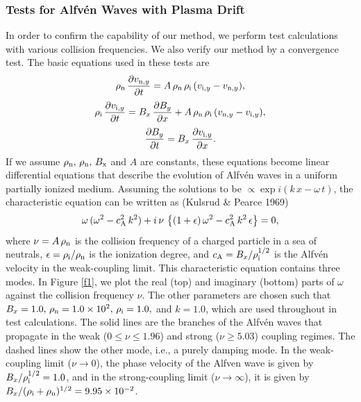 \documentclass[12pt,preprint]{aastex}
\begin{document}
\subsubsection{Tests for Alfv\'en Waves with Plasma Drift}
In order to confirm the capability of our method, 
we perform test calculations with various collision frequencies.
We also verify our method by a convergence test. 
The basic equations used in these tests are
\begin{equation}\label{KP1}
\rho_{\rm n}\,\frac{\partial v_{{\rm n},y}}{\partial t}=A\,\rho_{\rm n}\,\rho_{\rm i}\,(v_{{\rm i},y}-v_{{\rm n},y}),
\end{equation}
\begin{equation}
\rho_{\rm i}\,\frac{\partial v_{{\rm i},y}}{\partial t}=B_{x}\,\frac{\partial B_{y}}{\partial x}+A\,\rho_{\rm n}\,\rho_{\rm i}\,(v_{{\rm n},y}-v_{{\rm i},y}),
\end{equation}
\begin{equation}\label{KP3}
\frac{\partial B_{y}}{\partial t}=B_{x}\,\frac{\partial v_{{\rm i},y}}{\partial x}.
\end{equation}
If we assume $\rho_{\rm n},\,\rho_{\rm n},\,B_{\rm x}$ and $A$ are constants, these equations become linear differential equations 
that describe the evolution of Alfv\'en waves in a uniform partially ionized medium.
Assuming the solutions to be $\propto \exp i(k\,x-\omega\,t)$, the characteristic equation can be written as (Kulsrud \& Pearce 1969)
\begin{equation}\label{CHA}
\omega\,(\omega^{2}-c_{\rm A}^{2}\,k^{2})+i\,\nu\,\left\{ (1+\epsilon)\,\omega^{2}-c_{\rm A}^{2}\,k^{2}\,\epsilon \right\}=0,
\end{equation}
where $\nu=A\,\rho_{\rm n}$ is the collision frequency of a charged particle in a sea of neutrals, $\epsilon=\rho_{\rm i}/\rho_{\rm n}$ is the ionization degree, and $c_{\rm A}=B_{x}/\rho_{\rm i}^{1/2}$ is the Alfv\'en velocity in the weak-coupling limit.
This characteristic equation contains three modes.
In Figure \ref{f1}, we plot the real (top) and imaginary (bottom) parts of $\omega$ against the collision frequency $\nu$.
The other parameters are chosen such that $B_{x}=1.0,\,\rho_{\rm n}=1.0\times 10^{2},\,\rho_{\rm i}=1.0,$ and $k=1.0$, which are used throughout in test calculations.
The solid lines are the branches of the Alfv\'en waves that propagate in the weak ($0\le\nu\le 1.96$) and strong ($\nu\ge5.03$) coupling regimes.
The dashed lines show the other mode, i.e., a purely damping mode.
In the weak-coupling limit ($\nu \rightarrow 0$), the phase velocity of the Alfven wave is given by $B_{x}/\rho_{\rm i}^{1/2}=1.0$, and in the strong-coupling limit ($\nu \rightarrow \infty$), it is given by $B_{x}/(\rho_{\rm i}+\rho_{\rm n})^{1/2}=9.95\times 10^{-2}$.
\end{document}
